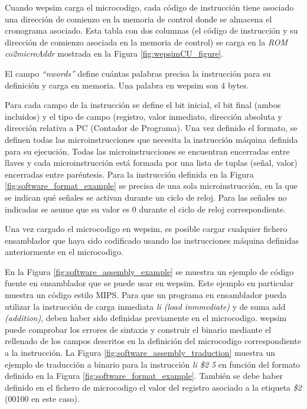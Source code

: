 Cuando \acrshort{wepsim} carga el \gls{microcodigo}, cada código de instrucción tiene asociado una dirección de comienzo en la memoria de control donde se almacena el cronograma asociado. Esta tabla con dos columnas (el código de instrucción y su dirección de comienzo asociada en la memoria de control) se carga en la \emph{ROM co2microAddr} mostrada en la Figura \ref{fig:wepsimCU_figure}.

El campo \emph{``nwords''} define cuántas palabras precisa la instrucción para su definición y carga en memoria. Una palabra en \acrshort{wepsim} son 4 bytes.

Para cada campo de la instrucción se define el bit inicial, el bit final (ambos incluidos) y el tipo de campo (registro, valor inmediato, dirección absoluta y dirección relativa a PC (Contador de Programa). Una vez definido el formato, se definen todas las microinstrucciones que necesita la instrucción máquina definida para su ejecución. Todas las microinstrucciones se encuentran encerradas entre llaves y cada microinstrucción está formada por una lista de tuplas (señal, valor) encerradas entre paréntesis. Para la instrucción definida en la Figura \ref{fig:software_format_example} se precisa de una sola microinstrucción, en la que se indican qué señales se activan durante un ciclo de reloj. Para las señales no indicadas se asume que su valor es 0 durante el ciclo de reloj correspondiente.

Una vez cargado el \gls{microcodigo} en \acrshort{wepsim}, es posible cargar cualquier fichero \gls{ensamblador} que haya sido codificado usando las instrucciones  máquina definidas anteriormente en el \gls{microcodigo}.

En la Figura \ref{fig:software_assembly_example} se muestra un ejemplo de código fuente en \gls{ensamblador} que se puede usar en \acrshort{wepsim}. Este ejemplo en particular muestra un código estilo MIPS. Para que un programa en \gls{ensamblador} pueda utilizar la instrucción de carga inmediata \emph{li (load inmmediate)} y de suma add \emph{(addition)}, deben haber sido definidas previamente en el \gls{microcodigo}. \acrshort{wepsim} puede comprobar los errores de sintaxis y construir el binario mediante el rellenado de los campos descritos en la definición del \gls{microcodigo} correspondiente a la instrucción. La Figura \ref{fig:software_assembly_traduction} muestra un ejemplo de traducción a binario para la instrucción \emph{li \$2 5} en función del formato definido en la Figura \ref{fig:software_format_example}. También se debe haber definido en el fichero de \gls{microcodigo} el valor del registro asociado a la etiqueta \emph{\$2} (00100 en este caso).

